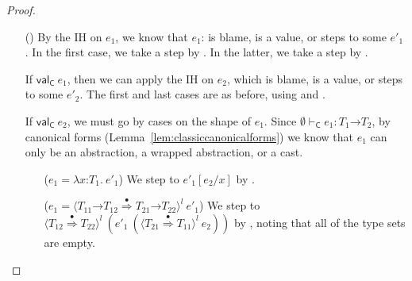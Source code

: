 \documentclass[9pt]{extarticle}
\newcommand{\ottnt}[1]{\mathit{#1}}
\newcommand{\ottsym}[1]{#1}
\begin{document}
\begin{lemma}
\begin{proof}
{\begin{itemize}
    \item[(\T{App})] By the IH on $\ottnt{e_{{\mathrm{1}}}}$, we know that $\ottnt{e_{{\mathrm{1}}}}$: is
      blame, is a value, or steps to some $\ottnt{e'_{{\mathrm{1}}}}$. In the first
      case, we take a step by . In the latter, we take a
      step by .

      If $ \mathsf{val} _{  \mathsf{C}  }~ \ottnt{e_{{\mathrm{1}}}} $, then we can apply the IH on $\ottnt{e_{{\mathrm{2}}}}$, which
      is blame, is a value, or steps to some $\ottnt{e'_{{\mathrm{2}}}}$. The first and
      last cases are as before, using  and .

      If $ \mathsf{val} _{  \mathsf{C}  }~ \ottnt{e_{{\mathrm{2}}}} $, we must go by cases on the shape of
      $\ottnt{e_{{\mathrm{1}}}}$. Since $ \emptyset   \vdash _{  \mathsf{C}  }  \ottnt{e_{{\mathrm{1}}}}  :   \ottnt{T_{{\mathrm{1}}}} \mathord{ \rightarrow } \ottnt{T_{{\mathrm{2}}}}  $, by canonical forms
      (Lemma~\ref{lem:classiccanonicalforms}) we know that $\ottnt{e_{{\mathrm{1}}}}$ can only
      be an abstraction, a wrapped abstraction, or a cast.
\begin{itemize}
      \item[($\ottnt{e_{{\mathrm{1}}}}  \ottsym{=}   \lambda \mathit{x} \mathord{:} \ottnt{T_{{\mathrm{1}}}} .~  \ottnt{e'_{{\mathrm{1}}}} $)] We step to $ \ottnt{e'_{{\mathrm{1}}}}  [  \ottnt{e_{{\mathrm{2}}}} / \mathit{x}  ] $ by
        .

      \item[($\ottnt{e_{{\mathrm{1}}}}  \ottsym{=}   \langle   \ottnt{T_{{\mathrm{11}}}} \mathord{ \rightarrow } \ottnt{T_{{\mathrm{12}}}}   \mathord{ \overset{\bullet}{\Rightarrow} }   \ottnt{T_{{\mathrm{21}}}} \mathord{ \rightarrow } \ottnt{T_{{\mathrm{22}}}}   \rangle^{ \ottnt{l} } ~  \ottnt{e'_{{\mathrm{1}}}} $)] We step to
        $ \langle  \ottnt{T_{{\mathrm{12}}}}  \mathord{ \overset{\bullet}{\Rightarrow} }  \ottnt{T_{{\mathrm{22}}}}  \rangle^{ \ottnt{l} } ~   (  \ottnt{e'_{{\mathrm{1}}}} ~  (  \langle  \ottnt{T_{{\mathrm{21}}}}  \mathord{ \overset{\bullet}{\Rightarrow} }  \ottnt{T_{{\mathrm{11}}}}  \rangle^{ \ottnt{l} } ~  \ottnt{e_{{\mathrm{2}}}}  )   )  $ by , noting
        that all of the type sets are empty.
      \end{itemize}


\end{itemize}}
\end{proof}
\end{lemma}
\end{document}
